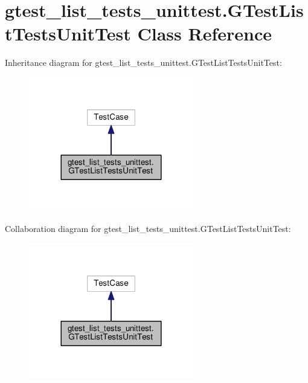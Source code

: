 \hypertarget{classgtest__list__tests__unittest_1_1GTestListTestsUnitTest}{}\section{gtest\+\_\+list\+\_\+tests\+\_\+unittest.\+G\+Test\+List\+Tests\+Unit\+Test Class Reference}
\label{classgtest__list__tests__unittest_1_1GTestListTestsUnitTest}


Inheritance diagram for gtest\+\_\+list\+\_\+tests\+\_\+unittest.\+G\+Test\+List\+Tests\+Unit\+Test\+:\nopagebreak
\begin{figure}[H]
\begin{center}
\leavevmode
\includegraphics[width=204pt]{classgtest__list__tests__unittest_1_1GTestListTestsUnitTest__inherit__graph}
\end{center}
\end{figure}


Collaboration diagram for gtest\+\_\+list\+\_\+tests\+\_\+unittest.\+G\+Test\+List\+Tests\+Unit\+Test\+:\nopagebreak
\begin{figure}[H]
\begin{center}
\leavevmode
\includegraphics[width=204pt]{classgtest__list__tests__unittest_1_1GTestListTestsUnitTest__coll__graph}
\end{center}
\end{figure}
